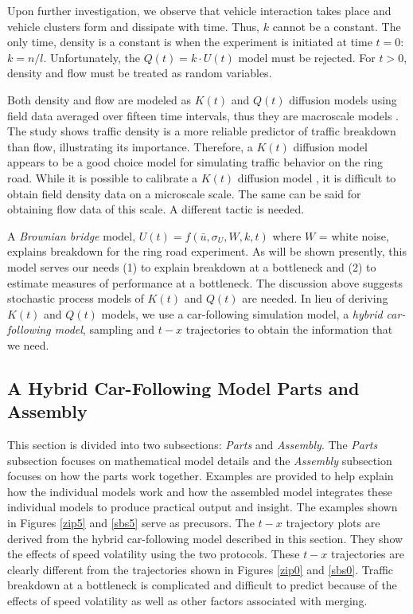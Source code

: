 \documentclass[Proceedings]{ascelike}
\begin{document}
Upon further investigation, we observe that vehicle interaction  takes place and vehicle clusters form and dissipate with time. Thus, $k$ cannot be a constant. The only time, density is a constant is when the experiment is initiated at time $t = 0$: $k = n/l$. Unfortunately, the $Q(t) = k \cdot U(t)$ model must be rejected. For $t > 0$, density and flow must be treated as random variables. 

Both density and flow are modeled as $K(t)$ and $Q(t)$ diffusion models using field data averaged over fifteen time intervals, thus they are macroscale models  \cite{pjo2017}. The study shows traffic density is a more reliable predictor of traffic breakdown than flow, illustrating its  importance. Therefore,  a $K(t)$ diffusion model appears to be a good choice model for simulating traffic behavior on the ring road.  While it is possible  to calibrate a $K(t)$ diffusion model \cite{KISH2000271}, it is difficult to obtain field density data on a microscale scale. The same can be said for obtaining flow data of this scale. A different tactic is needed.

A \emph{Brownian bridge} model, $U(t) = f(\bar{u},\sigma_U,W,k,t)$ where $W$ = white noise, explains breakdown for the ring road experiment. As will be shown presently, this model  serves our needs (1) to explain breakdown at a bottleneck and (2) to estimate measures of performance at a bottleneck. The discussion above suggests stochastic process models of $K(t)$ and $Q(t)$ are needed. In lieu of deriving $K(t)$ and $Q(t)$ models, we use a car-following simulation model, a \emph{hybrid car-following model}, sampling and $t-x$ trajectories to obtain the information that we need. 

 
\subsection{A Hybrid Car-Following Model Parts and Assembly} 

This section is divided into two subsections: \emph{Parts} and \emph{Assembly}. The \emph{Parts} subsection focuses on mathematical model details and the \emph{Assembly} subsection focuses on how the parts work together. Examples are provided to help explain how the individual models work and how the assembled model integrates these individual models to produce practical output and insight. The examples shown in Figures \ref{zip5} and \ref{sbs5} serve as precusors.  The $t-x$ trajectory plots are derived from the hybrid car-following model described in this section. They show the effects of speed volatility  using the two protocols. These $t-x$ trajectories are clearly different from the trajectories shown in Figures \ref{zip0} and \ref{sbs0}. Traffic breakdown at a bottleneck is complicated and difficult to predict because of the effects of speed volatility as well as other factors associated with merging.
\end{document}
